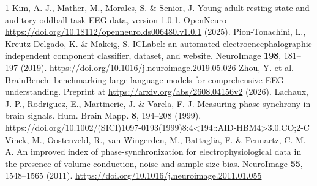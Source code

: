 \FloatBarrier
\renewcommand{\refname}{Supplementary references}
\begin{thebibliography}{1}
\label{si:references}
Kim, A. J., Mather, M., Morales, S. \& Senior, J.
Young adult resting state and auditory oddball task EEG data, version 1.0.1.
OpenNeuro \url{https://doi.org/10.18112/openneuro.ds006480.v1.0.1} (2025).
Pion-Tonachini, L., Kreutz-Delgado, K. \& Makeig, S.
ICLabel: an automated electroencephalographic independent component classifier, dataset, and website.
NeuroImage \textbf{198}, 181--197 (2019). \url{https://doi.org/10.1016/j.neuroimage.2019.05.026}
Zhou, Y. et al.
BrainBench: benchmarking large language models for comprehensive EEG understanding.
Preprint at \url{https://arxiv.org/abs/2608.04156v2} (2026).
Lachaux, J.-P., Rodriguez, E., Martinerie, J. \& Varela, F. J.
Measuring phase synchrony in brain signals.
Hum. Brain Mapp. \textbf{8}, 194--208 (1999). \url{https://doi.org/10.1002/(SICI)1097-0193(1999)8:4<194::AID-HBM4>3.0.CO;2-C}
Vinck, M., Oostenveld, R., van Wingerden, M., Battaglia, F. \& Pennartz, C. M. A.
An improved index of phase-synchronization for electrophysiological data in the presence of volume-conduction, noise and sample-size bias.
NeuroImage \textbf{55}, 1548--1565 (2011). \url{https://doi.org/10.1016/j.neuroimage.2011.01.055}
\end{thebibliography}



